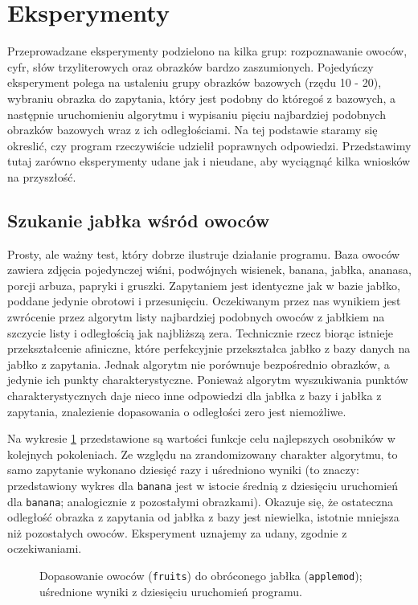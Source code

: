 \documentclass[a4paper,12pt,leqno]{article}
\begin{document}
\section{Eksperymenty}

Przeprowadzane eksperymenty podzielono na kilka grup: rozpoznawanie owoców, cyfr, słów trzyliterowych oraz obrazków bardzo zaszumionych.
Pojedyńczy eksperyment polega na ustaleniu grupy obrazków bazowych (rzędu 10 - 20), wybraniu obrazka do zapytania, który jest podobny do
któregoś z bazowych, a następnie uruchomieniu algorytmu i wypisaniu pięciu najbardziej podobnych obrazków bazowych wraz z ich odległościami.
Na tej podstawie staramy się okreslić, czy program rzeczywiście udzielił poprawnych odpowiedzi. Przedstawimy tutaj zarówno eksperymenty udane
jak i nieudane, aby wyciągnąć kilka wniosków na przyszłość.

\subsection{Szukanie jabłka wśród owoców}
Prosty, ale ważny test, który dobrze ilustruje działanie programu. Baza owoców zawiera zdjęcia pojedynczej wiśni, podwójnych wisienek, banana, 
jabłka, ananasa, porcji arbuza, papryki i gruszki. Zapytaniem jest identyczne jak w bazie jabłko, poddane jedynie obrotowi i przesunięciu.
Oczekiwanym przez nas wynikiem jest zwrócenie przez algorytm listy najbardziej podobnych owoców z jabłkiem na szczycie listy i odległością jak
najbliższą zera. Technicznie rzecz biorąc istnieje przekształcenie afiniczne, które perfekcyjnie przekształca jabłko z bazy danych na jabłko z
zapytania. Jednak algorytm nie porównuje bezpośrednio obrazków, a jedynie ich punkty charakterystyczne. Ponieważ algorytm wyszukiwania punktów
charakterystycznych daje nieco inne odpowiedzi dla jabłka z bazy i jabłka z zapytania, znalezienie dopasowania o odległości zero jest niemożliwe.

Na wykresie \ref{applemod} przedstawione są wartości funkcje celu najlepszych osobników w kolejnych pokoleniach. Ze względu na zrandomizowany
charakter algorytmu, to samo zapytanie wykonano dziesięć razy i uśredniono wyniki (to znaczy: przedstawiony wykres dla \texttt{banana} jest w
istocie średnią z dziesięciu uruchomień dla \texttt{banana}; analogicznie z pozostałymi obrazkami). Okazuje się, że ostateczna odległość
obrazka z zapytania od jabłka z bazy jest niewielka, istotnie mniejsza niż pozostałych owoców. Eksperyment uznajemy za udany, zgodnie z oczekiwaniami.

\begin{figure}\centering
\footnotesize\vspace{-2em}
\normalsize\caption{Dopasowanie owoców (\texttt{fruits}) do obróconego jabłka (\texttt{applemod}); uśrednione wyniki z dziesięciu uruchomień programu.}\label{applemod}
\end{figure} 
\end{document}
